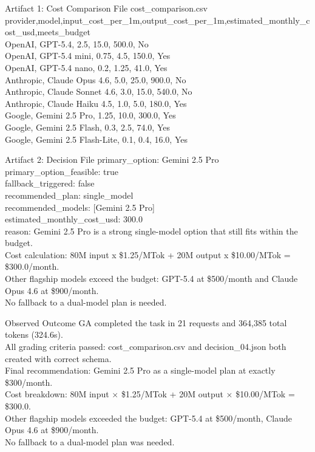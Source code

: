 \begin{CaseTraceBox}{Artifact 1: Cost Comparison File}
\small\ttfamily
cost\_comparison.csv \\
provider,model,input\_cost\_per\_1m,output\_cost\_per\_1m,estimated\_monthly\_cost\_usd,meets\_budget \\
OpenAI, GPT-5.4, 2.5, 15.0, 500.0, No \\
OpenAI, GPT-5.4 mini, 0.75, 4.5, 150.0, Yes \\
OpenAI, GPT-5.4 nano, 0.2, 1.25, 41.0, Yes \\
Anthropic, Claude Opus 4.6, 5.0, 25.0, 900.0, No \\
Anthropic, Claude Sonnet 4.6, 3.0, 15.0, 540.0, No \\
Anthropic, Claude Haiku 4.5, 1.0, 5.0, 180.0, Yes \\
Google, Gemini 2.5 Pro, 1.25, 10.0, 300.0, Yes \\
Google, Gemini 2.5 Flash, 0.3, 2.5, 74.0, Yes \\
Google, Gemini 2.5 Flash-Lite, 0.1, 0.4, 16.0, Yes
\end{CaseTraceBox}

\begin{CaseTraceBox}{Artifact 2: Decision File}
\small\ttfamily
primary\_option: Gemini 2.5 Pro \\
primary\_option\_feasible: true \\
fallback\_triggered: false \\
recommended\_plan: single\_model \\
recommended\_models: [Gemini 2.5 Pro] \\
estimated\_monthly\_cost\_usd: 300.0 \\
reason: Gemini 2.5 Pro is a strong single-model option that still fits within the budget. \\
Cost calculation: 80M input x \$1.25/MTok + 20M output x \$10.00/MTok = \$300.0/month. \\
Other flagship models exceed the budget: GPT-5.4 at \$500/month and Claude Opus 4.6 at \$900/month. \\
No fallback to a dual-model plan is needed.
\end{CaseTraceBox}

\begin{CaseAnswerBox}{Observed Outcome}
\small\ttfamily
GA completed the task in 21 requests and 364,385 total tokens (324.6s). \\
All grading criteria passed: cost\_comparison.csv and decision\_04.json both created with correct schema. \\
Final recommendation: Gemini 2.5 Pro as a single-model plan at exactly \$300/month. \\
Cost breakdown: 80M input $\times$ \$1.25/MTok + 20M output $\times$ \$10.00/MTok = \$300.0. \\
Other flagship models exceeded the budget: GPT-5.4 at \$500/month, Claude Opus 4.6 at \$900/month. \\
No fallback to a dual-model plan was needed.
\end{CaseAnswerBox}

